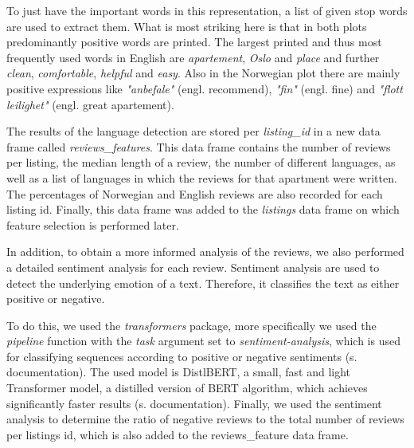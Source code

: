 \documentclass[12pt, letterpaper]{article}
\begin{document}
To just have the important words in this representation, a list of given stop words are used to extract them.
What is most striking here is that in both plots predominantly positive words are printed.
The largest printed and thus most frequently used words in English are \textit{apartement}, \textit{Oslo} and \textit{place} and further \textit{clean}, \textit{comfortable}, \textit{helpful} and \textit{easy}.
Also in the Norwegian plot there are mainly positive expressions like \textit{"anbefale"} (engl. recommend), \textit{"fin"} (engl. fine) and \textit{"flott leilighet"} (engl. great apartement).


The results of the language detection are stored per \textit{listing\_id} in a new data frame called \textit{reviews\_features}.
This data frame contains the number of reviews per listing, the median length of a review, the number of different languages, as well as a list of languages in which the reviews for that apartment were written.
The percentages of Norwegian and English reviews are also recorded for each listing id.
Finally, this data frame was added to the \textit{listings} data frame on which feature selection is performed later.

In addition, to obtain a more informed analysis of the reviews, we also performed a detailed sentiment analysis for each review. Sentiment analysis are used to detect the underlying emotion of a text.
Therefore, it classifies the text as either positive or negative.

To do this, we used the \textit{transformers} package, more specifically we used the \textit{pipeline} function with the \textit{task} argument set to \textit{sentiment-analysis}, which is used for classifying sequences according to positive or negative sentiments (s. documentation).
The used model is DistlBERT, a small, fast and light Transformer model, a distilled version of BERT algorithm, which achieves significantly faster results (s. documentation).
Finally, we used the sentiment analysis to determine the ratio of negative reviews to the total number of reviews per listings id, which is also added to the reviews\_feature data frame.


\end{document}
